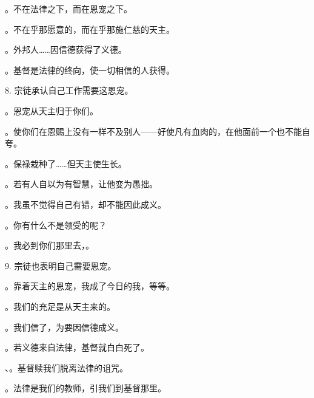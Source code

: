 。不在法律之下，而在恩宠之下。\par

。不在乎那愿意的，而在乎那施仁慈的天主。\par

。外邦人……因信德获得了义德。\par

。基督是法律的终向，使一切相信的人获得。\par

8. 宗徒承认自己工作需要这恩宠。\par

。恩宠从天主归于你们。\par

。使你们在恩赐上没有一样不及别人——好使凡有血肉的，在他面前一个也不能自夸。\par

。保禄栽种了……但天主使生长。\par

。若有人自以为有智慧，让他变为愚拙。\par

。我虽不觉得自己有错，却不能因此成义。\par

。你有什么不是领受的呢？\par

。我必到你们那里去，。\par

9. 宗徒也表明自己需要恩宠。\par

。靠着天主的恩宠，我成了今日的我，等等。\par

。我们的充足是从天主来的。\par

。我们信了，为要因信德成义。\par

。若义德来自法律，基督就白白死了。\par

、。基督赎我们脱离法律的诅咒。\par

。法律是我们的教师，引我们到基督那里。\par

